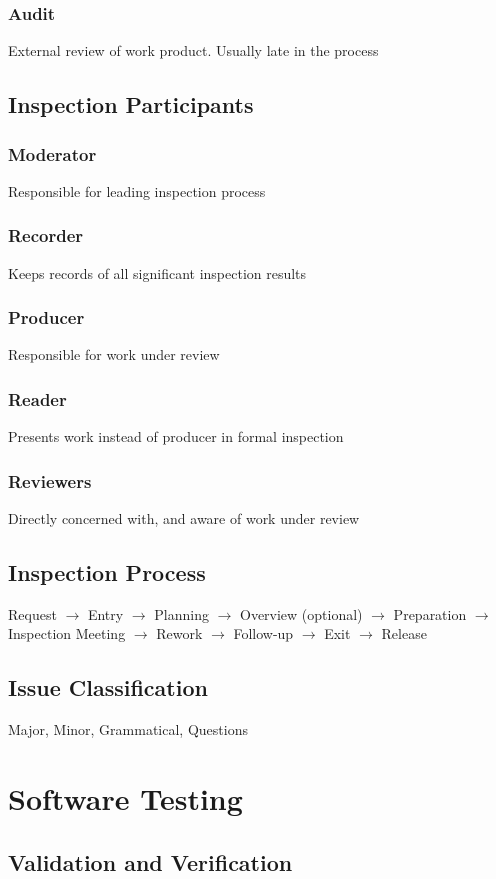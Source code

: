 \documentclass[10pt,a4paper]{article}
\begin{document}
\begin{landscape}
\begin{multicols}{3}
\subsubsection{Audit}
External review of work product. Usually late in the process
\subsection{Inspection Participants}
\subsubsection{Moderator}
Responsible for leading inspection process
\subsubsection{Recorder}
Keeps records of all significant inspection results
\subsubsection{Producer}
Responsible for work under review
\subsubsection{Reader}
Presents work instead of producer in formal inspection
\subsubsection{Reviewers}
Directly concerned with, and aware of work under review
\subsection{Inspection Process}
Request $\rightarrow$ Entry $\rightarrow$ Planning $\rightarrow$ Overview (optional) $\rightarrow$ Preparation $\rightarrow$ Inspection Meeting $\rightarrow$ Rework $\rightarrow$ Follow-up $\rightarrow$ Exit $\rightarrow$ Release
\subsection{Issue Classification}
Major, Minor, Grammatical, Questions

\section{Software Testing}
\subsection{Validation and Verification}

\end{multicols}
\end{landscape}
\end{document}
